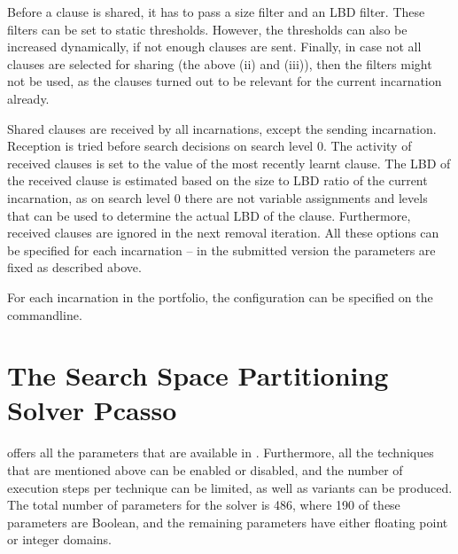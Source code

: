 \documentclass[conference]{IEEEtran}
\begin{document}
Before a clause is shared, it has to pass a size filter and an LBD filter. 
These filters can be set to static thresholds. 
However, the thresholds can also be increased dynamically, if not enough clauses are sent. 
Finally, in case not all clauses are selected for sharing (the above (ii) and (iii)), then the filters might not be used, as the clauses turned out to be relevant for the current incarnation already. 

Shared clauses are received by all incarnations, except the sending incarnation. 
Reception is tried before search decisions on search level $0$. 
The activity of received clauses is set to the value of the most recently learnt clause. 
The LBD of the received clause is estimated based on the size to LBD ratio of the current incarnation, as on search level $0$ there are not variable assignments and levels that can be used to determine the actual LBD of the clause. 
Furthermore, received clauses are ignored in the next removal iteration. 
All these options can be specified for each incarnation -- in the submitted version the parameters are fixed as described above. 

For each incarnation in the portfolio, the configuration can be specified on the commandline. 

\section{The Search Space Partitioning Solver Pcasso}

\riss offers all the parameters that are available in \glucose. 
Furthermore, all the techniques that are mentioned above can be enabled or disabled, and the number of execution steps per technique can be limited, as well as variants can be produced. 
The total number of parameters for the solver is 486, where 190 of these parameters are Boolean, and the remaining parameters have either floating point or integer domains. 
\end{document}
